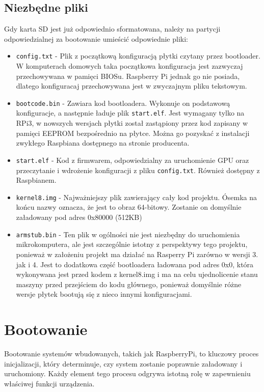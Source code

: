 \documentclass[shortabstract]{iithesis}
\begin{document}
\subsection{Niezbędne pliki}
Gdy karta SD jest już odpowiednio sformatowana, należy na partycji odpowiedzialnej za bootowanie umieścić odpowiednie pliki:
\begin{itemize}
 \item \texttt{config.txt}  - Plik z początkową konfiguracją płytki czytany przez bootloader. W komputerach domowych taka początkowa konfiguracja jest zazwyczaj przechowywana w pamięci BIOSu. Raspberry Pi jednak go nie posiada, dlatego konfiguracaj przechowywana jest w zwyczajnym pliku tekstowym.
 \item \texttt{bootcode.bin}  - Zawiara kod bootloadera. Wykonuje on podstawową konfiguracje, a następnie ładuje plik \texttt{start.elf}. Jest wymagany tylko na RPi3, w nowszych wersjach płytki został zastąpiony przez kod zapisany w pamięci EEPROM bezpośrednio na płytce. Można go pozyskać z instalacji zwykłego Raspbiana dostępnego na stronie producenta.
 \item \texttt{start.elf}  - Kod z firmwarem, odpowiedzialny za uruchomienie GPU oraz przeczytanie i wdrożenie konfiguracji z pliku \texttt{config.txt}. Również dostępny z Raspbianem.
 \item \texttt{kernel8.img}  - Najważniejszy plik zawierający cały kod projektu. Ósemka na końcu nazwy oznacza, że jest to obraz 64-bitowy. Zostanie on domyślnie załadowany pod adres 0x80000 (512KB)
 \item \texttt{armstub.bin}  - Ten plik w ogólności nie jest niezbędny do uruchomienia mikrokomputera, ale jest szczególnie istotny z perspektywy tego projektu, ponieważ w założeniu projekt ma działać na Rasperry Pi zarówno w wersji 3. jak i 4. Jest to dodatkowa część bootloadera ładowana pod adres 0x0, która wykonywana jest przed kodem z kernel8.img i ma na celu ujednolicenie stanu maszyny przed przejściem do kodu głównego, ponieważ domyślnie różne wersje płytek bootują się z nieco innymi konfiguracjami.
\end{itemize}

\section{Bootowanie}
Bootowanie systemów wbudowanych, takich jak RaspberryPi, to kluczowy proces inicjalizacji, który determinuje, czy system zostanie poprawnie załadowany i uruchomiony. Każdy element tego procesu odgrywa istotną rolę w zapewnieniu właściwej funkcji urządzenia.
\end{document}
